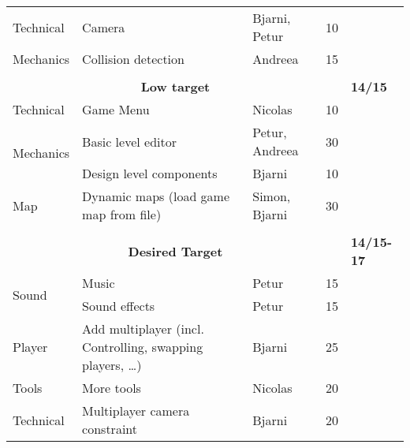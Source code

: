 \begin{table}[ht]
{\begin{tabular}{lllll}
Technical                      & Camera                                                   & Bjarni, Petur                   & 10          &                   \\
Mechanics                      & Collision detection                                      & Andreea                         & 15          &                   \\\\
\multicolumn{4}{c}{\textbf{Low target}}                                                                                                   & \textbf{14/15}    \\
Technical                      & Game Menu                                                & Nicolas                         & 10          &                   \\
\multirow{2}{*}{Mechanics}     & Basic level editor                                       & Petur, Andreea                  & 30          &                   \\
                               & Design level components                                  & Bjarni                          & 10          &                   \\
Map                            & Dynamic maps (load game map from file)                   & Simon, Bjarni                   & 30          &                   \\\\
\multicolumn{4}{c}{\textbf{Desired Target}}                                                                                               & \textbf{14/15-17} \\
\multirow{2}{*}{Sound}         & Music                                                    & Petur                           & 15          &                   \\
                               & Sound effects                                            & Petur                           & 15          &                   \\
Player                         & Add multiplayer (incl. Controlling, swapping players, …) & Bjarni                          & 25          &                   \\
Tools                          & More tools                                               & Nicolas                         & 20          &                   \\
Technical                      & Multiplayer camera constraint                            & Bjarni                          & 20          &                   \\

\end{tabular}}
\end{table}
